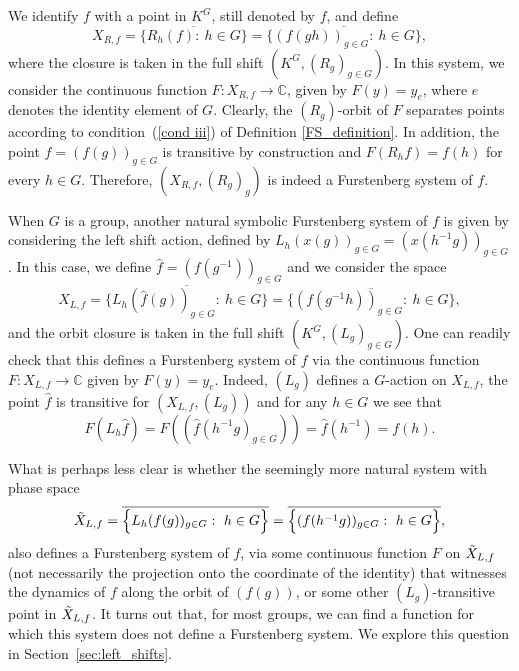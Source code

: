 \documentclass{amsart}
\numberwithin{equation}{section}
\theoremstyle{definition}
\theoremstyle{plain}
\begin{document}
We identify $f$ with a point in $K^G$, still denoted by $f$, and define
\begin{equation}
    X_{R,f}=\overline{\Big\{R_h(f):\ h\in G\Big\}}=\overline{\Big\{(f(gh))_{g\in G}:\ h\in G\Big\}},\label{def:X_R}
\end{equation}
where the closure is taken in the full shift $(K^{G},(R_g)_{g\in G})$. In this system, we consider the continuous function  $F:X_{R,f}\to \mathbb{C}$, given by $F(y)=y_{e}$, where $e$ denotes the identity element of $G$.
Clearly, the $(R_g)$-orbit of $F$ separates points according to condition~(\ref{cond iii}) of Definition \ref{FS_definition}. In addition, the point $f=(f(g))_{g\in G}$ is transitive by construction and $F(R_hf)=f(h)$ for every $h\in G$. Therefore, $(X_{R,f},(R_g)_g)$ is indeed a Furstenberg system of $f$.

When $G$ is a group, another natural symbolic Furstenberg system of $f$ is given by considering 
the left shift action, defined by $L_h(x(g))_{g\in G}=(x(h^{-1}g))_{g\in G}$. In this case, we define $\hat{f}=(f(g^{-1}))_{g\in G}$ and we consider the space
\begin{equation}
    X_{L,f}=\overline{\Big\{L_h(\hat{f}(g))_{g\in G}:\ h\in G\Big\}}=\overline{\Big\{(f(g^{-1}h))_{g\in G}:\ h\in G\Big\}},\label{def:X_L}
\end{equation}
and the orbit closure is taken in the full shift $(K^{G},(L_g)_{g\in G})$.  One can readily check that this defines a Furstenberg system of $f$ via the continuous function $F:X_{L,f}\to \mathbb{C}$ given by $F(y)=y_{e}$. Indeed, $(L_g)$ defines a $G$-action on $X_{L,f}$, the point $\hat{f}$ is transitive for $(X_{L,f},(L_g))$ and for any $h\in G$ we see that 
$$F(L_h\hat{f})=F((\hat{f}(h^{-1}g)_{g\in G}))=\hat{f}(h^{-1})=f(h).$$

What is perhaps less clear is whether the seemingly more natural system with phase space
\begin{equation}
    \Tilde{X}_{L,f}=\overline{\Big\{L_h(f(g))_{g\in G}:\ h\in G\Big\}}=\overline{\Big\{(f(h^{-1}g))_{g\in G}:\ h\in G\Big\}},\label{def:X'_L}
\end{equation}
also defines a Furstenberg system of $f$, via some continuous function $F$ on $\Tilde{X}_{L,f}$ (not necessarily the projection onto the coordinate of the identity) that witnesses the dynamics of $f$ along the orbit of $(f(g))$, or some other $(L_g)$-transitive point in $\Tilde{X}_{L,f}$. It turns out that, for most groups, we can find a function for which this system does not define a Furstenberg system. We explore this question in Section~\ref{sec:left_shifts}.
\end{document}
